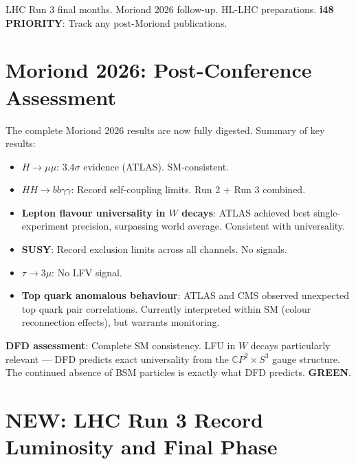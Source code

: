 \documentclass[11pt,a4paper]{article}
\newcommand{\GREEN}{\textcolor{dfdgreen}{\textbf{GREEN}}}
\newcommand{\NEW}{\textcolor{dfdblue}{\textbf{NEW}}}
\newcommand{\CP}{\mathbb{C}P}
\begin{document}
LHC Run 3 final months. Moriond 2026 follow-up. HL-LHC preparations. \textbf{i48 PRIORITY}: Track any post-Moriond publications.

\section{Moriond 2026: Post-Conference Assessment}

\begin{tcolorbox}[colback=green!5!white, colframe=green!60!black,
  title={Moriond 2026 Full Assessment: 45 Analyses, All SM-Consistent}]

The complete Moriond 2026 results are now fully digested. Summary of key results:
\begin{itemize}
\item \textbf{$H \to \mu\mu$}: $3.4\sigma$ evidence (ATLAS). SM-consistent.
\item \textbf{$HH \to bb\gamma\gamma$}: Record self-coupling limits. Run 2 + Run 3 combined.
\item \textbf{Lepton flavour universality in $W$ decays}: ATLAS achieved best single-experiment precision, surpassing world average. Consistent with universality.
\item \textbf{SUSY}: Record exclusion limits across all channels. No signals.
\item \textbf{$\tau \to 3\mu$}: No LFV signal.
\item \textbf{Top quark anomalous behaviour}: ATLAS and CMS observed unexpected top quark pair correlations. Currently interpreted within SM (colour reconnection effects), but warrants monitoring.
\end{itemize}

\textbf{DFD assessment}: Complete SM consistency. LFU in $W$ decays particularly relevant --- DFD predicts exact universality from the $\CP^2 \times S^3$ gauge structure. The continued absence of BSM particles is exactly what DFD predicts. \GREEN.
\end{tcolorbox}

\section{\NEW: LHC Run 3 Record Luminosity and Final Phase}
\end{document}
